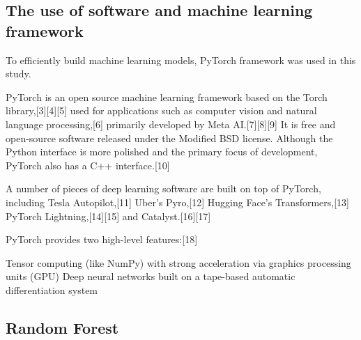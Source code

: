 \subsection{The use of software and machine learning framework}
To efficiently build machine learning models, PyTorch framework was used in this study. 

PyTorch is an open source machine learning framework based on the Torch library,[3][4][5] used for applications such as computer vision and natural language processing,[6] primarily developed by Meta AI.[7][8][9] It is free and open-source software released under the Modified BSD license. Although the Python interface is more polished and the primary focus of development, PyTorch also has a C++ interface.[10]

A number of pieces of deep learning software are built on top of PyTorch, including Tesla Autopilot,[11] Uber's Pyro,[12] Hugging Face's Transformers,[13] PyTorch Lightning,[14][15] and Catalyst.[16][17]

PyTorch provides two high-level features:[18]

Tensor computing (like NumPy) with strong acceleration via graphics processing units (GPU)
Deep neural networks built on a tape-based automatic differentiation system


\subsection{Random Forest}

